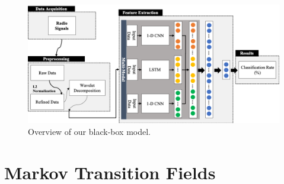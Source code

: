 \documentclass{turabian-thesis}
\begin{document}
\begin{figure}[h!]
   \begin{center}
      \includegraphics[scale=0.65]{../media/multimodal_overview.png}
   \end{center}
   \caption{Overview of our black-box model.}
   \label{fig:multimodal_overview}
\end{figure}






 
\chapter{Markov Transition Fields}
\label{chap:mtf}

\end{document}
